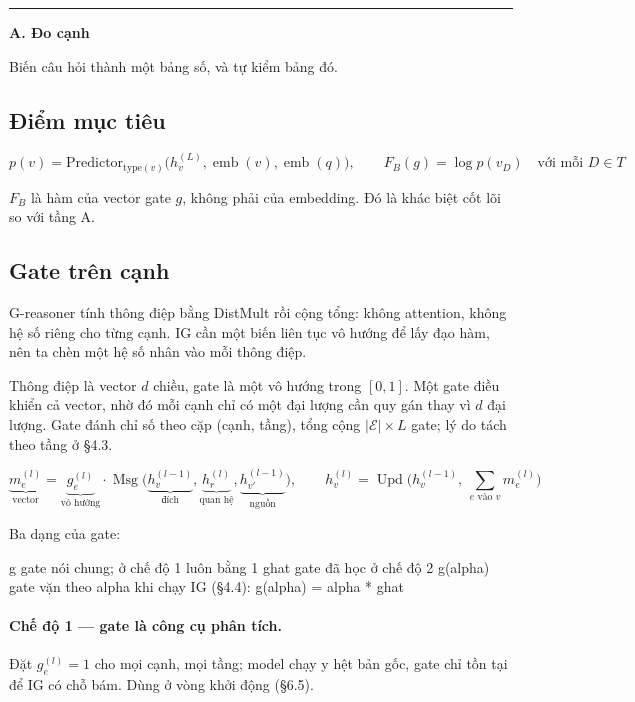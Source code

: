 \documentclass[11pt,a4paper]{article}
\DeclareMathOperator{\Msg}{Msg}
\DeclareMathOperator{\Upd}{Upd}
\DeclareMathOperator{\emb}{emb}
\begin{document}
\bigskip\noindent\rule{\linewidth}{0.8pt}\par\smallskip
\noindent\textbf{A. Đo cạnh}

Biến câu hỏi thành một bảng số, và tự kiểm bảng đó.

\subsection{Điểm mục tiêu}

\[
p(v)=\mathrm{Predictor}_{\mathrm{type}(v)}\big(h_v^{(L)},\emb(v),\emb(q)\big),
\qquad
F_B(g)=\log p(v_D)\quad\text{với mỗi } D\in T
\]

$F_B$ là hàm của vector gate $g$, không phải của embedding. Đó là khác biệt cốt lõi so với tầng A.

\subsection{Gate trên cạnh}
\label{sec:gate}

G-reasoner tính thông điệp bằng DistMult rồi cộng tổng: không attention, không hệ số riêng
cho từng cạnh. IG cần một biến liên tục vô hướng để lấy đạo hàm, nên ta chèn một hệ số nhân
vào mỗi thông điệp.

Thông điệp là vector $d$ chiều, gate là một vô hướng trong $[0,1]$. Một gate điều khiển cả
vector, nhờ đó mỗi cạnh chỉ có một đại lượng cần quy gán thay vì $d$ đại lượng. Gate đánh
chỉ số theo cặp (cạnh, tầng), tổng cộng $|\mathcal{E}|\times L$ gate; lý do tách theo tầng
ở \S4.3.

\[
\underbrace{m_e^{(l)}}_{\text{vector}}
= \underbrace{g_e^{(l)}}_{\text{vô hướng}}\cdot
\Msg\big(\underbrace{h_v^{(l-1)}}_{\text{đích}},
         \underbrace{h_r^{(l)}}_{\text{quan hệ}},
         \underbrace{h_{v'}^{(l-1)}}_{\text{nguồn}}\big),
\qquad
h_v^{(l)}=\Upd\Big(h_v^{(l-1)},\ \textstyle\sum_{e\text{ vào }v} m_e^{(l)}\Big)
\]

Ba dạng của gate:

\begin{dia}
g         gate nói chung; ở chế độ 1 luôn bằng 1
ghat      gate đã học ở chế độ 2
g(alpha)  gate vặn theo alpha khi chạy IG (§4.4):  g(alpha) = alpha * ghat
\end{dia}

\paragraph{Chế độ 1 --- gate là công cụ phân tích.}
Đặt $g_e^{(l)}=1$ cho mọi cạnh, mọi tầng; model chạy y hệt bản gốc, gate chỉ tồn tại để IG
có chỗ bám. Dùng ở vòng khởi động (\S6.5).
\end{document}

